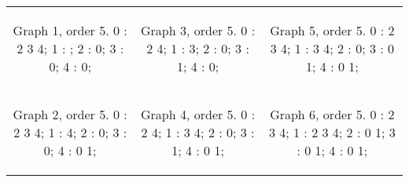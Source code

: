 \begin{tabular}{|c|c|c|}
\begin{minipage}{1.5in}
\begin{output}
Graph 1, order 5.
  0 : 2 3 4;
  1 : ;
  2 : 0;
  3 : 0;
  4 : 0;

\end{output}
\end{minipage}

&

\begin{minipage}{1.5in}
\begin{output}
Graph 3, order 5.
  0 : 2 4;
  1 : 3;
  2 : 0;
  3 : 1;
  4 : 0;

\end{output}
\end{minipage}

&

\begin{minipage}{1.5in}
\begin{output}
Graph 5, order 5.
  0 : 2 3 4;
  1 : 3 4;
  2 : 0;
  3 : 0 1;
  4 : 0 1;

\end{output}
\end{minipage}

\\

\begin{minipage}{1.5in}
\begin{output}
Graph 2, order 5.
  0 : 2 3 4;
  1 : 4;
  2 : 0;
  3 : 0;
  4 : 0 1;

\end{output}
\end{minipage}

&

\begin{minipage}{1.5in}
\begin{output}
Graph 4, order 5.
  0 : 2 4;
  1 : 3 4;
  2 : 0;
  3 : 1;
  4 : 0 1;

\end{output}
\end{minipage}

&

\begin{minipage}{1.5in}
\begin{output}
Graph 6, order 5.
  0 : 2 3 4;
  1 : 2 3 4;
  2 : 0 1;
  3 : 0 1;
  4 : 0 1;
\end{output}
\end{minipage}

\\
\end{tabular}


